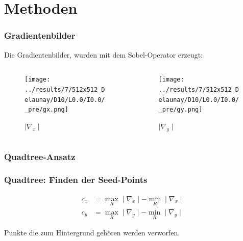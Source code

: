 \documentclass[xcolor=dvipsnames]{beamer}
\begin{document}
\section{Methoden}

\begin{frame}
	\frametitle{Gradientenbilder}
	
	Die Gradientenbilder, wurden mit dem Sobel-Operator erzeugt:
	
	\begin{columns}
		\begin{column}{5cm}
			\begin{figure}
				\texttt{[image: ../results/7/512x512\_Delaunay/D10/L0.0/I0.0/\_pre/gx.png]}
				\caption{$\mid \nabla_x \mid$}
			\end{figure}
		\end{column}
		\begin{column}{5cm}
			\begin{figure}
				\texttt{[image: ../results/7/512x512\_Delaunay/D10/L0.0/I0.0/\_pre/gy.png]}
				\caption{$\mid \nabla_y \mid$}
			\end{figure}
		\end{column}
	\end{columns}
\end{frame}

\begin{frame}
	\frametitle{Quadtree-Ansatz}
	\begin{figure}
		\centering
	\end{figure}
\end{frame}

\begin{frame}
	\frametitle{Quadtree: Finden der Seed-Points}

	\begin{align}
	c_x &= \max\limits_{R} \mid \nabla_x \mid - \min\limits_{R} \mid \nabla_x \mid \\
	c_y &= \max\limits_{R} \mid \nabla_y \mid - \min\limits_{R} \mid \nabla_y \mid
	\end{align}
	
	Punkte die zum Hintergrund gehören werden verworfen.
\end{frame}
\end{document}
